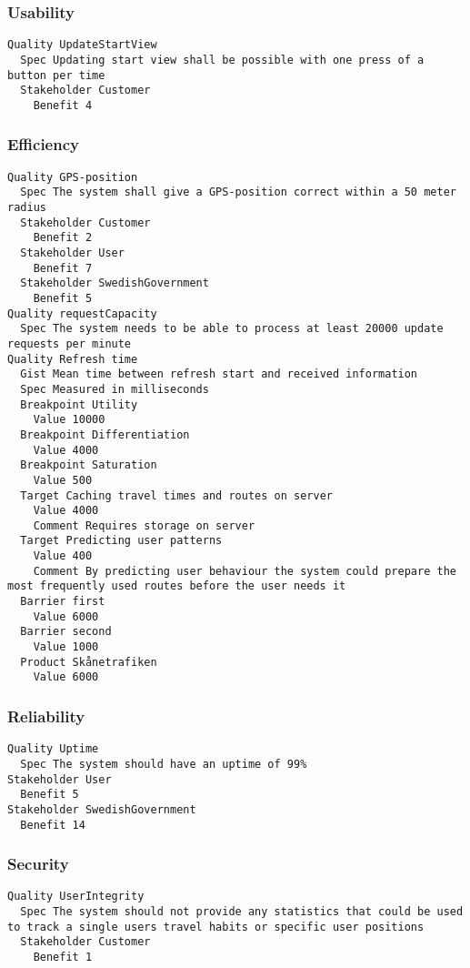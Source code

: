 \begin{lstlisting}

\end{lstlisting}


       \subsubsection{Usability}


\begin{lstlisting}
Quality UpdateStartView
  Spec Updating start view shall be possible with one press of a button per time
  Stakeholder Customer
    Benefit 4

\end{lstlisting}
    
        
       \subsubsection{Efficiency}


\begin{lstlisting}
Quality GPS-position
  Spec The system shall give a GPS-position correct within a 50 meter radius
  Stakeholder Customer
    Benefit 2
  Stakeholder User
    Benefit 7
  Stakeholder SwedishGovernment
    Benefit 5
Quality requestCapacity
  Spec The system needs to be able to process at least 20000 update requests per minute
Quality Refresh time
  Gist Mean time between refresh start and received information
  Spec Measured in milliseconds
  Breakpoint Utility
    Value 10000
  Breakpoint Differentiation
    Value 4000
  Breakpoint Saturation
    Value 500
  Target Caching travel times and routes on server
    Value 4000
    Comment Requires storage on server
  Target Predicting user patterns
    Value 400
    Comment By predicting user behaviour the system could prepare the most frequently used routes before the user needs it
  Barrier first
    Value 6000
  Barrier second
    Value 1000
  Product Skånetrafiken
    Value 6000

\end{lstlisting}
    
        
       \subsubsection{Reliability}


\begin{lstlisting}
Quality Uptime
  Spec The system should have an uptime of 99%
Stakeholder User
  Benefit 5
Stakeholder SwedishGovernment
  Benefit 14

\end{lstlisting}
    
        
       \subsubsection{Security}


\begin{lstlisting}
Quality UserIntegrity
  Spec The system should not provide any statistics that could be used to track a single users travel habits or specific user positions
  Stakeholder Customer
    Benefit 1

\end{lstlisting}